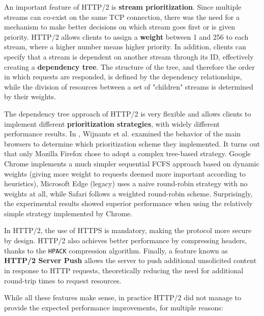 An important feature of HTTP/2 is \textbf{stream prioritization}. Since multiple streams can co-exist on the same TCP connection, there was the need for a mechanism to make better decisions on which stream goes first or is given priority. HTTP/2 allows clients to assign a \textbf{weight} between 1 and 256 to each stream, where a higher number means higher priority. In addition, clients can specify that a stream is dependent on another stream through its ID, effectively creating a \textbf{dependency tree}. The structure of the tree, and therefore the order in which requests are responded, is defined by the dependency relationships, while the division of resources between a set of "children" streams is determined by their weights.

The dependency tree approach of HTTP/2 is very flexible and allows clients to implement different \textbf{prioritization strategies}, with widely different performance results. In \cite{http2pri}, Wijnants et al. examined the behavior of the main browsers to determine which prioritization scheme they implemented. It turns out that only Mozilla Firefox chose to adopt a complex tree-based strategy. Google Chrome implements a much simpler sequential FCFS approach based on dynamic weights (giving more weight to requests deemed more important according to heuristics), Microsoft Edge (legacy) uses a naive round-robin strategy with no weights at all, while Safari follows a weighted round-robin scheme. Surprisingly, the experimental results showed superior performance when using the relatively simple strategy implemented by Chrome.


In HTTP/2, the use of HTTPS is mandatory, making the protocol more secure by design. HTTP/2 also achieves better performance by compressing headers, thanks to the \texttt{HPACK} compression algorithm. Finally, a feature known as \textbf{HTTP/2 Server Push} allows the server to push additional unsolicited content in response to HTTP requests, theoretically reducing the need for additional round-trip times to request resources.

While all these features make sense, in practice HTTP/2 did not manage to provide the expected performance improvements, for multiple reasons:

